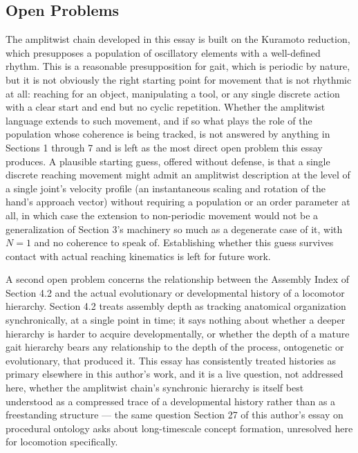 \documentclass[12pt]{article}
\begin{document}
\subsection{Open Problems}

The amplitwist chain developed in this essay is built on the Kuramoto reduction, which presupposes a population of oscillatory elements with a well-defined rhythm. This is a reasonable presupposition for gait, which is periodic by nature, but it is not obviously the right starting point for movement that is not rhythmic at all: reaching for an object, manipulating a tool, or any single discrete action with a clear start and end but no cyclic repetition. Whether the amplitwist language extends to such movement, and if so what plays the role of the population whose coherence is being tracked, is not answered by anything in Sections 1 through 7 and is left as the most direct open problem this essay produces. A plausible starting guess, offered without defense, is that a single discrete reaching movement might admit an amplitwist description at the level of a single joint's velocity profile (an instantaneous scaling and rotation of the hand's approach vector) without requiring a population or an order parameter at all, in which case the extension to non-periodic movement would not be a generalization of Section 3's machinery so much as a degenerate case of it, with $N = 1$ and no coherence to speak of. Establishing whether this guess survives contact with actual reaching kinematics is left for future work.

A second open problem concerns the relationship between the Assembly Index of Section 4.2 and the actual evolutionary or developmental history of a locomotor hierarchy. Section 4.2 treats assembly depth as tracking anatomical organization synchronically, at a single point in time; it says nothing about whether a deeper hierarchy is harder to acquire developmentally, or whether the depth of a mature gait hierarchy bears any relationship to the depth of the process, ontogenetic or evolutionary, that produced it. This essay has consistently treated histories as primary elsewhere in this author's work, and it is a live question, not addressed here, whether the amplitwist chain's synchronic hierarchy is itself best understood as a compressed trace of a developmental history rather than as a freestanding structure — the same question Section 27 of this author's essay on procedural ontology asks about long-timescale concept formation, unresolved here for locomotion specifically.
\end{document}
